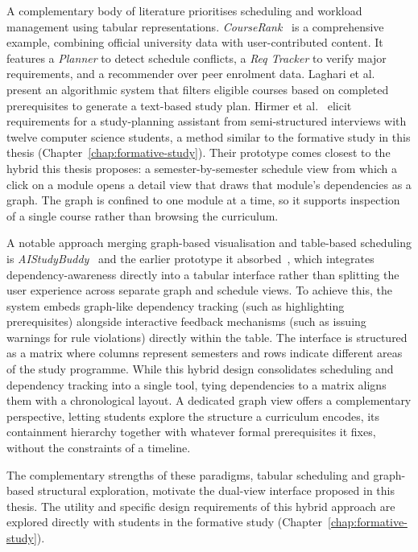 A complementary body of literature prioritises scheduling and workload management using tabular representations. \emph{CourseRank}~\cite{bercovitz_courserank_2009} is a comprehensive example, combining official university data with user-contributed content. It features a \emph{Planner} to detect schedule conflicts, a \emph{Req Tracker} to verify major requirements, and a recommender over peer enrolment data. Laghari et al.~\cite{laghari_academic_2023} present an algorithmic system that filters eligible courses based on completed prerequisites to generate a text-based study plan. Hirmer et al.~\cite{hirmer_requirements_2022} elicit requirements for a study-planning assistant from semi-structured interviews with twelve computer science students, a method similar to the formative study in this thesis (Chapter~\ref{chap:formative-study}). Their prototype comes closest to the hybrid this thesis proposes: a semester-by-semester schedule view from which a click on a module opens a detail view that draws that module's dependencies as a graph. The graph is confined to one module at a time, so it supports inspection of a single course rather than browsing the curriculum.

A notable approach merging graph-based visualisation and table-based scheduling is \emph{AIStudyBuddy}~\cite{roepke_study_2024} and the earlier prototype it absorbed~\cite{judel_supporting_2023}, which integrates dependency-awareness directly into a tabular interface rather than splitting the user experience across separate graph and schedule views. To achieve this, the system embeds graph-like dependency tracking (such as highlighting prerequisites) alongside interactive feedback mechanisms (such as issuing warnings for rule violations) directly within the table. The interface is structured as a matrix where columns represent semesters and rows indicate different areas of the study programme. While this hybrid design consolidates scheduling and dependency tracking into a single tool, tying dependencies to a matrix aligns them with a chronological layout. A dedicated graph view offers a complementary perspective, letting students explore the structure a curriculum encodes, its containment hierarchy together with whatever formal prerequisites it fixes, without the constraints of a timeline.

The complementary strengths of these paradigms, tabular scheduling and graph-based structural exploration, motivate the dual-view interface proposed in this thesis. The utility and specific design requirements of this hybrid approach are explored directly with students in the formative study (Chapter~\ref{chap:formative-study}).

